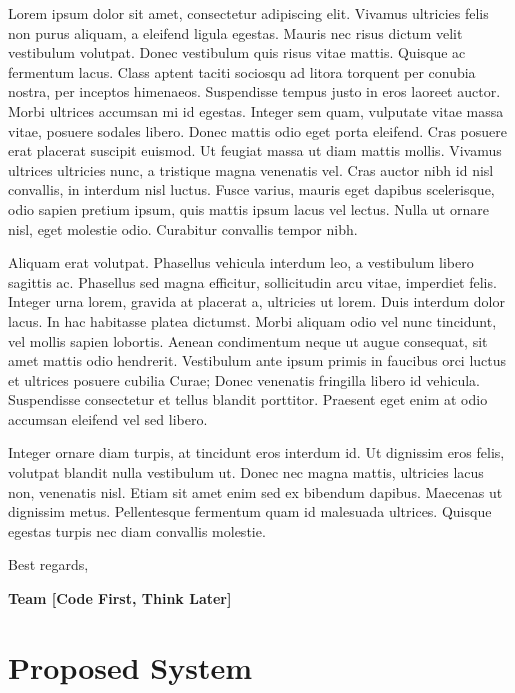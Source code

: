 \documentclass[12pt,letterpaper]{article}
\begin{document}
Lorem ipsum dolor sit amet, consectetur adipiscing elit.
Vivamus ultricies felis non purus aliquam, a eleifend ligula egestas.
Mauris nec risus dictum velit vestibulum volutpat. Donec vestibulum
quis risus vitae mattis. Quisque ac fermentum lacus. Class aptent
taciti sociosqu ad litora torquent per conubia nostra, per inceptos
himenaeos. Suspendisse tempus justo in eros laoreet auctor. Morbi
ultrices accumsan mi id egestas. Integer sem quam, vulputate vitae
massa vitae, posuere sodales libero. Donec mattis odio eget porta
eleifend. Cras posuere erat placerat suscipit euismod. Ut feugiat
massa ut diam mattis mollis. Vivamus ultrices ultricies nunc, a tristique
magna venenatis vel. Cras auctor nibh id nisl convallis, in interdum
nisl luctus. Fusce varius, mauris eget dapibus scelerisque, odio sapien
pretium ipsum, quis mattis ipsum lacus vel lectus. Nulla ut ornare
nisl, eget molestie odio. Curabitur convallis tempor nibh.

Aliquam erat volutpat. Phasellus vehicula interdum leo, a
vestibulum libero sagittis ac. Phasellus sed magna efficitur, sollicitudin
arcu vitae, imperdiet felis. Integer urna lorem, gravida at placerat
a, ultricies ut lorem. Duis interdum dolor lacus. In hac habitasse
platea dictumst. Morbi aliquam odio vel nunc tincidunt, vel mollis
sapien lobortis. Aenean condimentum neque ut augue consequat, sit
amet mattis odio hendrerit. Vestibulum ante ipsum primis in faucibus
orci luctus et ultrices posuere cubilia Curae; Donec venenatis fringilla
libero id vehicula. Suspendisse consectetur et tellus blandit porttitor.
Praesent eget enim at odio accumsan eleifend vel sed libero.

Integer ornare diam turpis, at tincidunt eros interdum id.
Ut dignissim eros felis, volutpat blandit nulla vestibulum ut. Donec
nec magna mattis, ultricies lacus non, venenatis nisl. Etiam sit amet
enim sed ex bibendum dapibus. Maecenas ut dignissim metus. Pellentesque
fermentum quam id malesuada ultrices. Quisque egestas turpis nec diam
convallis molestie.

\vspace{1em}

\noindent Best regards,

\vspace{1em}

\textbf{Team [Code First, Think Later]}

\newpage{}

\section{Proposed System}
\end{document}

